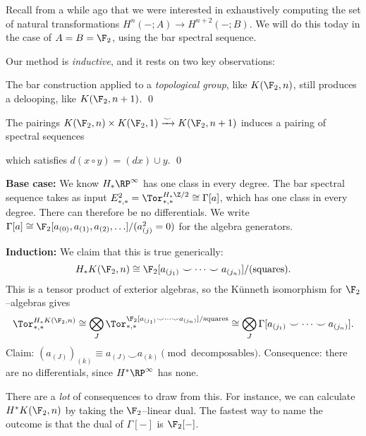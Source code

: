 Recall from a while ago that we were interested in exhaustively computing the set of natural transformations $H^n(-; A) \to H^{n+2}(-; B)$.  We will do this today in the case of $A = B = \F_2$, using the bar spectral sequence.

Our method is \emph{inductive}, and it rests on two key observations:
\begin{lemma}
The bar construction applied to a \emph{topological group}, like $K(\F_2, n)$, still produces a delooping, like $K(\F_2, n+1)$. \qed
\end{lemma}

\begin{lemma}
The pairings $K(\F_2, n) \times K(\F_2, 1) \xrightarrow\smile K(\F_2, n+1)$ induces a pairing of spectral sequences
\begin{center}
\end{center}
which satisfies $d(x \circ y) = (dx) \cup y$.  \qed
\end{lemma}

\textbf{Base case:} We know $H_* \RP^\infty$ has one class in every degree.  The bar spectral sequence takes as input $E_{*, *}^2 = \Tor^{H_* \Z/2}_{*, *} \cong \Gamma[a]$, which has one class in every degree.  There can therefore be no differentials.  We write $\Gamma[a] \cong \F_2[a_{(0)}, a_{(1)}, a_{(2)}, \ldots] / (a_{(j)}^2 = 0)$ for the algebra generators.

\textbf{Induction:} We claim that this is true generically: \[H_* K(\F_2, n) \cong \F_2[a_{(j_1)} \smile \cdots \smile a_{(j_n)}] / (\text{squares}).\]  This is a tensor product of exterior algebras, so the K\"unneth isomorphism for $\F_2$--algebras gives \[\Tor^{H_* K(\F_2, n)}_{*, *} \cong \bigotimes_J \Tor^{\F_2[a_{(j_1)} \smile \cdots \smile a_{(j_n)}] / \text{squares}}_{*, *} \cong \bigotimes_J \Gamma[a_{(j_1)} \smile \cdots \smile a_{(j_n)}].\]  Claim: $(a_{(J)})_{(k)} \equiv a_{(J)} \smile a_{(k)} \pmod{\text{decomposables}}$.  Consequence: there are no differentials, since $H^* \RP^\infty$ has none.

There are a \emph{lot} of consequences to draw from this.  For instance, we can calculate $H^* K(\F_2, n)$ by taking the $\F_2$--linear dual.  The fastest way to name the outcome is that the dual of $\Gamma[-]$ is $\F_2[-]$.

